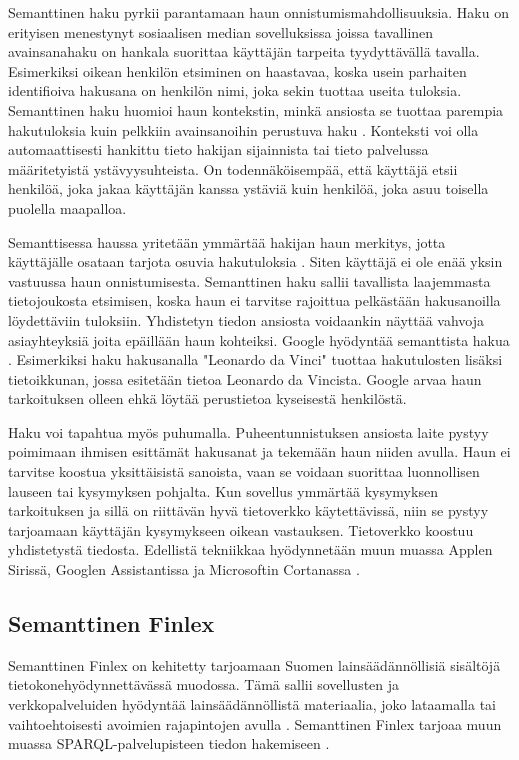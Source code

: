 \documentclass[finnish, 12pt, a4paper, elec, utf8, pdfa, online]{aaltothesis}
\begin{document}
{Semanttinen haku pyrkii parantamaan haun onnistumismahdollisuuksia. Haku on erityisen menestynyt sosiaalisen median sovelluksissa joissa tavallinen avainsanahaku on hankala suorittaa käyttäjän tarpeita tyydyttävällä tavalla. Esimerkiksi oikean henkilön etsiminen on haastavaa, koska usein parhaiten identifioiva hakusana on henkilön nimi, joka sekin tuottaa useita tuloksia. Semanttinen haku huomioi haun kontekstin, minkä ansiosta se tuottaa parempia hakutuloksia kuin pelkkiin avainsanoihin perustuva haku \cite{profium_search}. Konteksti voi olla automaattisesti hankittu tieto hakijan sijainnista tai tieto palvelussa määritetyistä ystävyysuhteista. On todennäköisempää, että käyttäjä etsii henkilöä, joka jakaa käyttäjän kanssa ystäviä kuin henkilöä, joka asuu toisella puolella maapalloa.

Semanttisessa haussa yritetään ymmärtää hakijan haun merkitys, jotta käyttäjälle osataan tarjota osuvia hakutuloksia \cite{profium_search}. Siten käyttäjä ei ole enää yksin vastuussa haun onnistumisesta. Semanttinen haku sallii tavallista laajemmasta tietojoukosta etsimisen, koska haun ei tarvitse rajoittua pelkästään hakusanoilla löydettäviin tuloksiin. Yhdistetyn tiedon ansiosta voidaankin näyttää  vahvoja asiayhteyksiä joita epäillään haun kohteiksi. Google hyödyntää semanttista hakua \cite{knowledge_graph}  \cite{linked_data_finlad}. Esimerkiksi haku hakusanalla "Leonardo da Vinci" tuottaa hakutulosten lisäksi tietoikkunan, jossa esitetään tietoa Leonardo da Vincista. Google arvaa haun tarkoituksen olleen ehkä löytää perustietoa kyseisestä henkilöstä.

Haku voi tapahtua myös puhumalla. Puheentunnistuksen ansiosta laite pystyy poimimaan ihmisen esittämät hakusanat ja tekemään haun niiden avulla. Haun ei tarvitse koostua yksittäisistä sanoista, vaan se voidaan suorittaa luonnollisen lauseen tai kysymyksen pohjalta. Kun sovellus ymmärtää kysymyksen tarkoituksen ja sillä on riittävän hyvä tietoverkko käytettävissä, niin se pystyy tarjoamaan käyttäjän kysymykseen oikean vastauksen. Tietoverkko koostuu yhdistetystä tiedosta. Edellistä tekniikkaa hyödynnetään muun muassa Applen Sirissä, Googlen Assistantissa ja Microsoftin Cortanassa \cite{siri} \cite{assistant} \cite{cortana}.

\subsection{Semanttinen Finlex}
Semanttinen Finlex on kehitetty tarjoamaan Suomen lainsäädännöllisiä sisältöjä tietokonehyödynnettävässä muodossa. Tämä sallii sovellusten ja verkkopalveluiden hyödyntää lainsäädännöllistä materiaalia, joko lataamalla tai vaihtoehtoisesti avoimien rajapintojen avulla \cite{finlex}. Semanttinen Finlex tarjoaa muun muassa SPARQL-palvelupisteen tiedon hakemiseen \cite{finlex2}.

}
\end{document}
